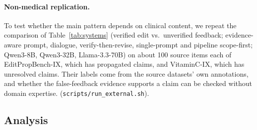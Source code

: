 \paragraph{Non-medical replication.} To test whether the main pattern depends on clinical content, we repeat the comparison of Table~\ref{tab:systems} (verified edit vs.\ unverified feedback; evidence-aware prompt, dialogue, verify-then-revise, single-prompt and pipeline scope-first; Qwen3-8B, Qwen3-32B, Llama-3.3-70B) on about 100 source items each of EditPropBench-IX, which has propagated claims, and VitaminC-IX, which has unresolved claims. Their labels come from the source datasets' own annotations, and whether the false-feedback evidence supports a claim can be checked without domain expertise. \pending{} (\texttt{scripts/run\_external.sh}).

\subsection{Analysis}
\label{sec:analysis}
